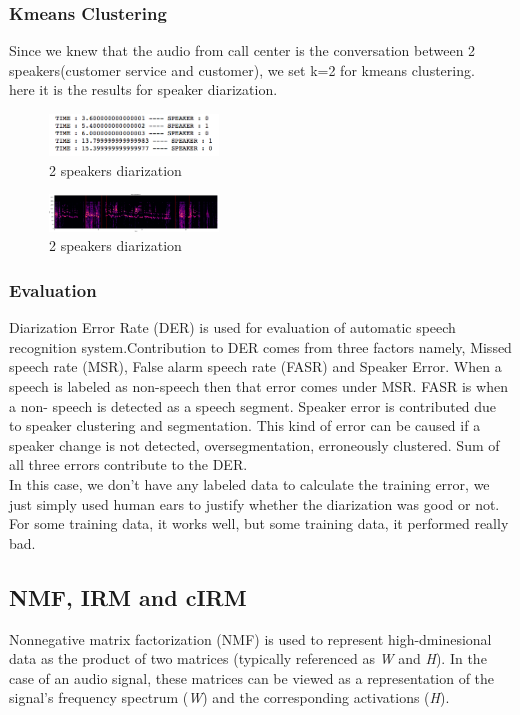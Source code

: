 \documentclass[journal, a4paper]{IEEEtran}
\begin{document}
\subsubsection{Kmeans Clustering}
Since we knew that the audio from call center is the conversation between 2 speakers(customer service and customer), we set k=2 for kmeans clustering.\\
here it is the results for speaker diarization.
\begin{figure}[h!]
    \centering  
     \caption{\label{Fig:speaker diarization}2 speakers diarization}  
    \includegraphics[width=0.4\textwidth]{kmeans01.png} 
\end{figure}

\begin{figure}[h!]
    \centering  
     \caption{\label{Fig:speaker diarization}2 speakers diarization}  
    \includegraphics[width=0.4\textwidth]{kmeans02.png}
\end{figure}
\subsubsection{Evaluation\cite{Segmentation}}Diarization Error Rate (DER) is used for evaluation of automatic speech recognition system.Contribution to DER comes from three factors namely, Missed speech rate (MSR), False alarm speech rate (FASR) and Speaker Error. When a speech is labeled as non-speech then that error comes under MSR. FASR is when a non- speech is detected as a speech segment. Speaker error is contributed due to speaker clustering and segmentation. This kind of error can be caused if a speaker change is not detected, oversegmentation, erroneously clustered. Sum of all three errors contribute to the DER.\\
In this case, we don't have any labeled data to calculate the training error, we just simply used human ears to justify whether the diarization was good or not. For some training data, it works well, but some training data, it performed really bad. 

\subsection{NMF, IRM and cIRM}
Nonnegative matrix factorization (NMF) is used to represent high-dminesional data as the product of two matrices (typically referenced as \textit{W} and \textit{H}). In the case of an audio signal, these matrices can be viewed as a representation of the signal's frequency spectrum (\textit{W}) and the corresponding activations (\textit{H}).
\end{document}
